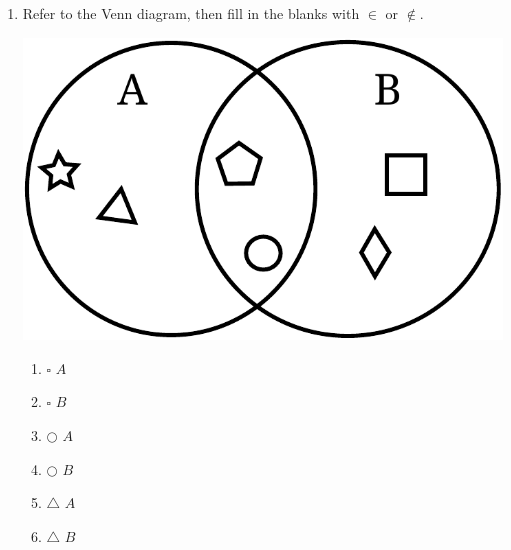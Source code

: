 \documentclass{tufte-book}
\begin{document}
\begin{enumerate}
  \item Refer to the Venn diagram, then fill in the blanks with $\in$ or $\notin$.
  \begin{marginfigure}\includegraphics[width=\textwidth]{maths/fig/venn_sets.pdf}\end{marginfigure}
  \begin{multicols}{4}
  \begin{enumerate}
    \item $\square$ \dotfill $A$\bigskip
    \item $\square$ \dotfill $B$\bigskip
    \item $\bigcirc$ \dotfill $A$\bigskip
    \item $\bigcirc$ \dotfill $B$\bigskip
    \item $\triangle$ \dotfill $A$\bigskip
    \item $\triangle$ \dotfill $B$\bigskip
  \end{enumerate}
  \end{multicols}
\end{enumerate}
\end{document}
